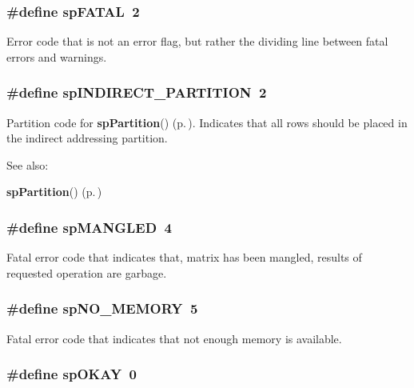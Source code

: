 \subsubsection{\setlength{\rightskip}{0pt plus 5cm}\#define sp\-FATAL\ 2}\label{spMatrix_8h_a7}


Error code that is not an error flag, but rather the dividing line between fatal errors and warnings. 
\subsubsection{\setlength{\rightskip}{0pt plus 5cm}\#define sp\-INDIRECT\_\-PARTITION\ 2}\label{spMatrix_8h_a11}


Partition code for {\bf sp\-Partition}() {\rm (p.\,\pageref{spMatrix_8h_a47})}. Indicates that all rows should be placed in the indirect addressing partition. \begin{Desc}
\item[See also: ]\par
{\bf sp\-Partition}() {\rm (p.\,\pageref{spMatrix_8h_a47})} \end{Desc}
\subsubsection{\setlength{\rightskip}{0pt plus 5cm}\#define sp\-MANGLED\ 4}\label{spMatrix_8h_a4}


Fatal error code that indicates that, matrix has been mangled, results of requested operation are garbage. 
\subsubsection{\setlength{\rightskip}{0pt plus 5cm}\#define sp\-NO\_\-MEMORY\ 5}\label{spMatrix_8h_a5}


Fatal error code that indicates that not enough memory is available. 
\subsubsection{\setlength{\rightskip}{0pt plus 5cm}\#define sp\-OKAY\ 0}\label{spMatrix_8h_a0}


